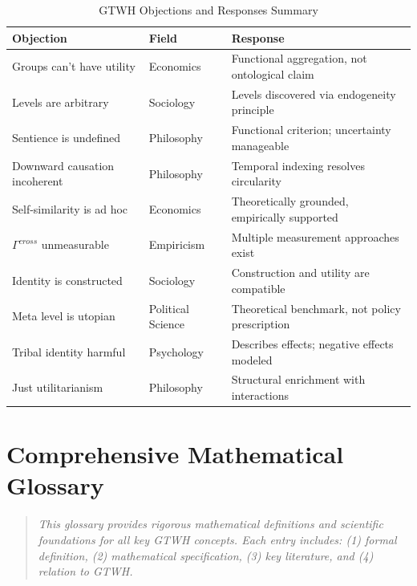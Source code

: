 \begin{table}[htbp]
\centering
\caption{GTWH Objections and Responses Summary}
\label{tab:aaa-objections-summary}
\renewcommand{\arraystretch}{1.3}
\small
\begin{tabular}{@{}p{3cm}p{3cm}p{6cm}@{}}
\toprule
\textbf{Objection} & \textbf{Field} & \textbf{Response} \\
\midrule
Groups can't have utility & Economics & Functional aggregation, not ontological claim \\
Levels are arbitrary & Sociology & Levels discovered via endogeneity principle \\
Sentience is undefined & Philosophy & Functional criterion; uncertainty manageable \\
Downward causation incoherent & Philosophy & Temporal indexing resolves circularity \\
Self-similarity is ad hoc & Economics & Theoretically grounded, empirically supported \\
$\Gamma^{cross}$ unmeasurable & Empiricism & Multiple measurement approaches exist \\
Identity is constructed & Sociology & Construction and utility are compatible \\
Meta level is utopian & Political Science & Theoretical benchmark, not policy prescription \\
Tribal identity harmful & Psychology & Describes effects; negative effects modeled \\
Just utilitarianism & Philosophy & Structural enrichment with interactions \\
\bottomrule
\end{tabular}
\end{table}



\section{Comprehensive Mathematical Glossary}
\label{sec:aaa-glossary-extended}

\begin{quote}
\textit{This glossary provides rigorous mathematical definitions and scientific 
foundations for all key GTWH concepts. Each entry includes: (1) formal definition, 
(2) mathematical specification, (3) key literature, and (4) relation to GTWH.}
\end{quote}

